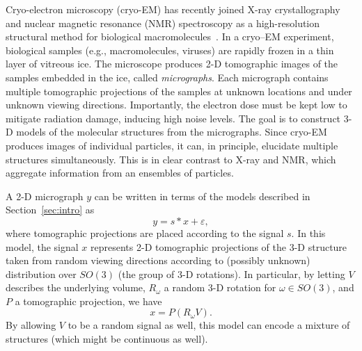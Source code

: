 \documentclass[12pt]{article}
\newcommand{\1}{\mathbf{1}}
\theoremstyle{plain}
\theoremstyle{definition}
\theoremstyle{remark}
\theoremstyle{plain}
\theoremstyle{remark}
\theoremstyle{plain}
\theoremstyle{plain}
\theoremstyle{plain}
\numberwithin{equation}{section}
\begin{document}
Cryo-electron microscopy (cryo-EM)  has recently joined X-ray crystallography and nuclear magnetic resonance (NMR) spectroscopy as a high-resolution structural method for biological macromolecules~\cite{frank2006three,kuhlbrandt2014resolution,bartesaghi20152}.
In a cryo--EM experiment, biological samples (e.g., macromolecules, viruses) are rapidly frozen in a thin layer of vitreous ice.
The microscope produces 2-D tomographic images of the samples embedded in the ice, called \emph{micrographs}. Each micrograph contains multiple tomographic projections of the samples at unknown locations and under unknown viewing directions. 
Importantly, the electron dose must be kept low to mitigate  radiation damage, inducing high noise levels.
The goal is to construct 3-D models of the molecular structures from the micrographs. 
Since  cryo-EM produces images of individual particles, it can, in principle, elucidate multiple  structures simultaneously.
This is in clear contrast to  X-ray and NMR, which aggregate information from an ensembles of
particles.

A 2-D micrograph $y$ can be written in terms 
of the models described in Section~\ref{sec:intro} as
\begin{equation}  \label{eq:model_cryo}
y  =   s \ast x + \varepsilon,
\end{equation}
where tomographic projections are placed according to the signal $s$. In this model, the signal $x$ represents 2-D tomographic projections of the 3-D structure taken from  random viewing directions according to (possibly unknown) distribution over $SO(3)$ (the group of 3-D rotations). In particular, by letting $V$ describes the underlying volume, $R_\omega$ a random 3-D rotation for $\omega\in SO(3)$, and $P$ a tomographic projection, we have
\begin{equation}
x= P(R_\omega V).
\end{equation}
By allowing $V$ to be a random signal as well, this model can encode a mixture of structures  
(which might be continuous as well).
\end{document}
